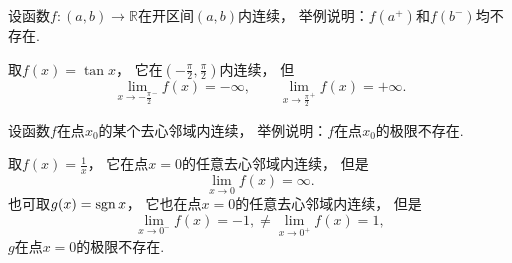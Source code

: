\begin{example}
设函数\(f\colon(a,b)\to\mathbb{R}\)在开区间\((a,b)\)内连续，
举例说明：\(f(a^+)\)和\(f(b^-)\)均不存在.
\begin{solution}
取\(f(x) = \tan x\)，
它在\(\left( -\frac\pi2,\frac\pi2 \right)\)内连续，
但\begin{equation*}
	\lim_{x\to-\frac\pi2^-} f(x) = -\infty,
	\qquad
	\lim_{x\to\frac\pi2^+} f(x) = +\infty.
\end{equation*}
\end{solution}
\end{example}
\begin{example}
设函数\(f\)在点\(x_0\)的某个去心邻域内连续，
举例说明：\(f\)在点\(x_0\)的极限不存在.
\begin{solution}
取\(f(x) = \frac1x\)，
它在点\(x=0\)的任意去心邻域内连续，
但是\begin{equation*}
	\lim_{x\to0} f(x) = \infty.
\end{equation*}
也可取\(g(x) = \operatorname{sgn} x\)，
它也在点\(x=0\)的任意去心邻域内连续，
但是\begin{equation*}
	\lim_{x\to0^-} f(x) = -1,
	\neq
	\lim_{x\to0^+} f(x) = 1,
\end{equation*}
\(g\)在点\(x=0\)的极限不存在.
\end{solution}
\end{example}

